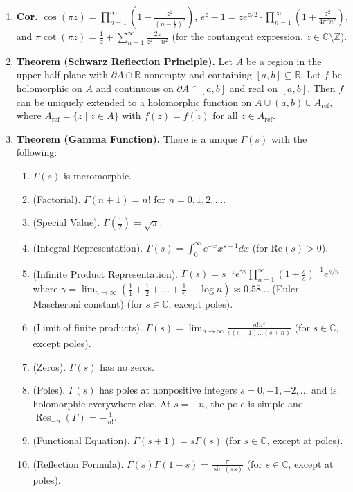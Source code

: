 \documentclass[10pt]{article}
\theoremstyle{definition}
\theoremstyle{named}
\DeclareMathOperator{\Res}{Res}
\begin{document}
\begin{enumerate}
    \item \textbf{Cor. } $\cos(\pi z) = \prod_{n=1}^{\infty} \left(1 - \frac{z^2}{\left(n - \frac{1}{2}\right)^2}\right)$, $e^z - 1 = ze^{z/2} \cdot \prod_{n=1}^{\infty} \left(1 + \frac{z^2}{4\pi^2n^2}\right)$, and $\pi\cot(\pi z) = \frac{1}{z} + \sum_{n=1}^{\infty} \frac{2z}{z^2 - n^2}$ (for the contangent expression, $z \in \mathbb{C} \setminus \mathbb{Z}$). 
    \item \textbf{Theorem (Schwarz Reflection Principle). } Let $A$ be a region in the upper-half plane with $\partial A \cap \mathbb{R}$ nonempty and containing $[a,b] \subseteq \mathbb{R}$. Let $f$ be holomorphic on $A$ and continuous on $\partial A \cap [a,b]$ and real on $[a,b]$. Then $f$ can be uniquely extended to a holomorphic function on $A \cup (a,b) \cup A_{\textrm{ref}}$, where $A_{\textrm{ref}} = \{\overline{z} \mid z \in A\}$ with $f(z) = \overline{f(\overline{z})}$ for all $z \in A_{\textrm{ref}}$. 
    \item \textbf{Theorem (Gamma Function). } There is a unique $\Gamma(s)$ with the following: 
    \begin{enumerate}
        \item $\Gamma(s)$ is meromorphic. 
        \item (Factorial). $\Gamma(n+1) = n!$ for $n=0,1,2,\dots$. 
        \item (Special Value). $\Gamma(\frac{1}{2}) = \sqrt{\pi}$. 
        \item (Integral Representation). $\Gamma(s) = \int_{0}^{\infty} e^{-x} x^{s-1} dx$ (for $\textrm{Re}(s) > 0$). 
        \item (Infinite Product Representation). $\Gamma(s) = s^{-1}e^{\gamma s} \prod_{n=1}^{\infty} \left(1 + \frac{s}{s}\right)^{-1} e^{s/n}$ where $\gamma = \lim_{n \to \infty} \left(\frac{1}{1} + \frac{1}{2} + \dots + \frac{1}{n} - \log n\right) \approx 0.58...$ (Euler-Mascheroni constant) (for $s \in \mathbb{C}$, except poles). 
        \item (Limit of finite products). $\Gamma(s) = \lim_{n \to \infty} \frac{n! n^s}{s(s+1)\dots(s+n)}$ (for $s \in \mathbb{C}$, except poles). 
        \item (Zeros). $\Gamma(s)$ has no zeros. 
        \item (Poles). $\Gamma(s)$ has poles at nonpositive integers $s=0,-1,-2,\dots$ and is holomorphic everywhere else. At $s=-n$, the pole is simple and $\Res_{-n}(\Gamma) = -\frac{1}{n!}$. 
        \item (Functional Equation). $\Gamma(s+1) = s\Gamma(s)$ (for $s \in \mathbb{C}$, except at poles). 
        \item (Reflection Formula). $\Gamma(s)\Gamma(1-s) = \frac{\pi}{\sin(\pi s)}$ (for $s \in \mathbb{C}$, except at poles). 
        

\end{enumerate}
\end{enumerate}
\end{document}
